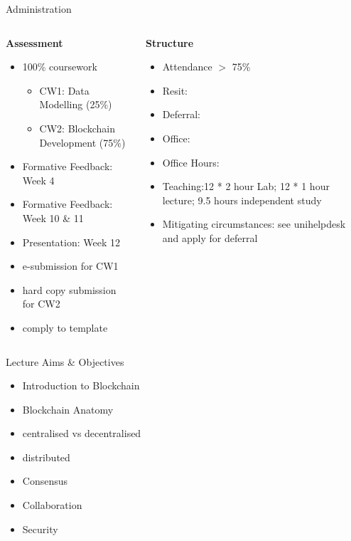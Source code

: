 \documentclass[pdf,table]{beamer}
\begin{document}
\begin{frame}{Administration}
	\begin{columns}[T]
		\begin{column}{0.48\textwidth}
			{\bf Assessment}
			\begin{itemize}
				\item 100\% coursework
					\begin{itemize}
						\item CW1: Data Modelling (25\%)
						\item CW2: Blockchain Development (75\%)
					\end{itemize}
				\item Formative Feedback: Week 4
				\item Formative Feedback: Week 10 \& 11
				\item Presentation: Week 12
				\item e-submission for CW1
				\item hard copy submission for CW2
				\item comply to template
			\end{itemize}
		\end{column}
		\begin{column}{0.48\textwidth}
			{\bf Structure}
			\begin{itemize}
				\item Attendance $>$ 75\%
				\item Resit: \resitdeadline
				\item Deferral: 
				\item Office: \office
				\item Office Hours: \officehours
				\item Teaching:12 * 2 hour Lab; 12 * 1 hour lecture; 9.5 hours independent study 
				\item Mitigating circumstances: see unihelpdesk and apply for deferral
			\end{itemize}
		\end{column}
	\end{columns}	
\end{frame}


	\begin{frame}{Lecture Aims \& Objectives}
		\begin{itemize}
			\item Introduction to Blockchain
			\item Blockchain Anatomy
			\item centralised vs decentralised
			\item distributed
			\item Consensus
			\item Collaboration
			\item Security
		\end{itemize}
	\end{frame}	
\end{document}
